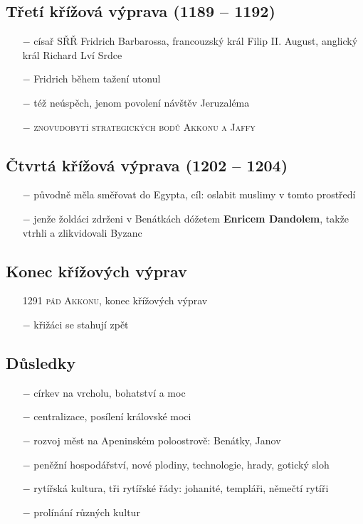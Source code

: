 \documentclass{article}
\begin{document}
\subsection*{Třetí křížová výprava (1189 -- 1192)}
\begin{itemize}
    \vspace{-0.5em}
    \setlength\itemsep{0.15em}
    \item[$-$] císař SŘŘ Fridrich Barbarossa, francouzský král Filip II. August, anglický král Richard Lví Srdce
    \item[$-$] Fridrich během tažení utonul
    \item[$-$] též neúspěch, jenom povolení návštěv Jeruzaléma
    \item[$-$] \textsc{znovudobytí strategických bodů Akkonu a Jaffy}
\end{itemize}


\subsection*{Čtvrtá křížová výprava (1202 -- 1204)}
\begin{itemize}
    \vspace{-0.5em}
    \setlength\itemsep{0.15em}
    \item[$-$] původně měla směřovat do Egypta, cíl: oslabit muslimy v tomto prostředí
    \item[$-$] jenže žoldáci zdrženi v Benátkách dóžetem \textbf{Enricem Dandolem}, takže vtrhli a zlikvidovali Byzanc
\end{itemize}


\subsection*{Konec křížových výprav}
\begin{itemize}
    \vspace{-0.5em}
    \setlength\itemsep{0.15em}
    \item[1291] \textsc{pád Akkonu}, konec křížových výprav
    \item[$-$] křižáci se stahují zpět
\end{itemize}


\subsection*{Důsledky}
\begin{itemize}
    \vspace{-0.5em}
    \setlength\itemsep{0.15em}
    \item[$-$] církev na vrcholu, bohatství a moc
    \item[$-$] centralizace, posílení královské moci
    \item[$-$] rozvoj měst na Apeninském poloostrově: Benátky, Janov
    \item[$-$] peněžní hospodářství, nové plodiny, technologie, hrady, gotický sloh
    \item[$-$] rytířská kultura, tři rytířské řády: johanité, templáři, němečtí rytíři
    \item[$-$] prolínání různých kultur
\end{itemize}
\end{document}
